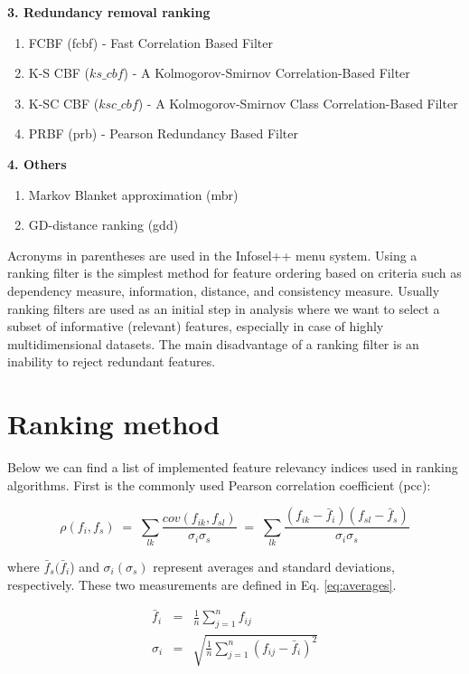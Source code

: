 \documentclass[a4paper,fleqn]{report}
\newcommand\be{\vspace*{1pt}\begin{equation}}
\newcommand\ee{\end{equation}\vspace*{1pt}}
\begin{document}
{\bf 3. Redundancy removal ranking}
\begin{enumerate}
\item FCBF (fcbf) - Fast Correlation Based Filter \cite{HuanLiu2004}
\item K-S CBF ($ks\_cbf$) - A Kolmogorov-Smirnov Correlation-Based Filter \cite{Biesiada2005,Biesiada2007}
\item K-SC CBF ($ksc\_cbf$) - A Kolmogorov-Smirnov Class Correlation-Based Filter \cite{Blachnik2009}
\item PRBF (prb) - Pearson Redundancy Based Filter \cite{Biesiada2008}
\end{enumerate}

{\bf 4. Others}
\begin{enumerate}
\item Markov Blanket approximation (mbr) \cite{Koller1996,Xing2001}
\item GD-distance ranking (gdd) \cite{Mantaras1994}
\end{enumerate}


Acronyms in parentheses are used in the Infosel++ menu system. Using a ranking filter is the simplest method 
for feature ordering based on
criteria such as dependency measure, information, distance, and consistency measure. Usually ranking filters are used 
as an initial step in analysis where we want to select a subset of informative (relevant) features, especially in case of 
highly multidimensional datasets. The main disadvantage of a ranking filter is an inability to reject redundant features. 

\section{Ranking method}
Below we can find a list of implemented feature relevancy indices used in ranking algorithms. 
First is the commonly used Pearson correlation coefficient (pcc): 

\be \label{eq:ro}
\rho(f_i,f_s)\;=\;\sum_{lk}  \frac{cov(f_{ik},f_{sl})}{\sigma_i \sigma_s}\;=\; \sum_{lk}
\frac{(f_{ik}-\bar{f}_i)(f_{sl}-\bar{f}_s)}{\sigma_i \sigma_s}
\ee

where $ \bar{f}_s (\bar{f}_i$) and $ \sigma_i (\sigma_s) $ represent averages and standard deviations, respectively. 
These two measurements are defined in Eq. \ref{eq:averages}. 

\begin{eqnarray} \label{eq:averages}
\bar{f}_{i}&=&\frac{1}{n} \sum_{j=1}^{n} f_{ij} \\
\sigma_{i}  &=& \sqrt{\frac{1}{n} \sum_{j=1}^{n} \left( f_{ij} - \bar{f}_{i}\right)^2} \nonumber
\end{eqnarray}
\end{document}
